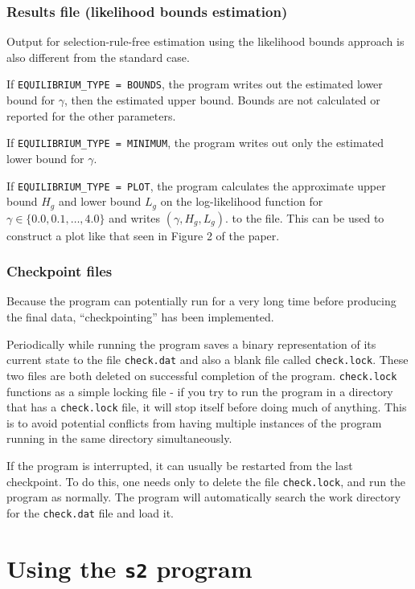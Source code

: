 \documentclass{article}
\begin{document}
\subsubsection{Results file (likelihood bounds estimation)}

Output for selection-rule-free estimation using the likelihood bounds
approach is also different from the standard case.

If {\tt EQUILIBRIUM\_{}TYPE = BOUNDS}, the program writes out the estimated
lower bound for $\gamma$, then the estimated upper bound.  Bounds are not calculated
or reported for the other parameters.

If {\tt EQUILIBRIUM\_{}TYPE = MINIMUM}, the program writes out only the estimated
lower bound for $\gamma$.

If {\tt EQUILIBRIUM\_{}TYPE = PLOT}, the program calculates the approximate
upper bound $H_g$ and lower bound $L_g$ on the log-likelihood function for $\gamma \in \{0.0,0.1,\ldots,4.0\}$
and writes $(\gamma,H_g,L_g)$. to the file.  This can be used to construct a plot
like that seen in Figure 2 of the paper.


\subsubsection{Checkpoint files}

Because the program can potentially run for a very long time before producing the final
data, ``checkpointing'' has been implemented.  

Periodically while running the program saves a binary representation of its 
current state to the file {\tt check.dat} and also a blank file called {\tt check.lock}. 
These two files are both deleted on successful completion of the program.
{\tt check.lock} functions as a simple locking file - if you try to run the program in a directory
that has a {\tt check.lock} file, it will stop itself before doing much of anything.  
This is to avoid potential conflicts from having multiple instances of the program 
running in the same directory simultaneously.

If the program is interrupted, it can usually be restarted from the last checkpoint.  To do this,
one needs only to delete the file {\tt check.lock}, and run the program as normally.  
The program will automatically search the work directory for the {\tt check.dat} file and load 
it.  


\section{Using the {\tt s2} program}\label{sec:s2}
\end{document}
